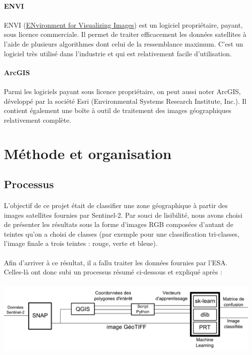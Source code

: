 \documentclass[a4paper,10pt]{report}
\begin{document}
\paragraph{ENVI}
\paragraph{}
ENVI ({\href{http://www.exelisvis.fr/ProduitsetServices/LesproduitsENVI/ENVI.aspx}{ENvironment for Visualizing Images}}) est un logiciel propriétaire, payant, sous licence commerciale. Il permet de traiter efficacement les données satellites à l'aide de plusieurs algorithmes dont celui de la ressemblance maximum. C'est un logiciel très utilisé dans l'industrie et qui est relativement facile d'utilisation.
\paragraph{ArcGIS}
\paragraph{}
Parmi les logiciels payant sous licence propriétaire, on peut aussi noter ArcGIS, développé par la société Esri (Environmental Systems Research Institute, Inc.). Il contient également une boîte à outil de traitement des images géographiques relativement complète.

\section{Méthode et organisation}
\subsection{Processus}
\paragraph{}
L'objectif de ce projet était de classifier une zone géographique à partir des images satellites fournies par Sentinel-2. Par souci de lisibilité, nous avons choisi de présenter les résultats sous la forme d'images RGB composées d'autant de teintes qu'on a choisi de classes (par exemple pour une classification tri-classes, l'image finale a trois teintes : rouge, verte et bleue).
\paragraph{}
Afin d'arriver à ce résultat, il a fallu traiter les données fournies par l'ESA. Celles-là ont donc subi un processus résumé ci-dessous et expliqué après : \\\\
\includegraphics[scale=0.3]{process_Multispec.pdf}
\end{document}

